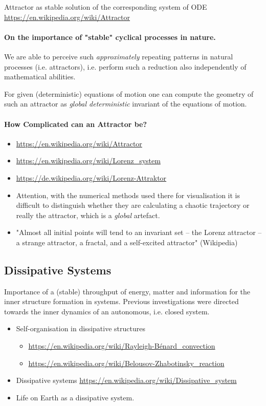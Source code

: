 \documentclass[11pt,a4paper]{article}
\begin{document}
Attractor as stable solution of the corresponding system of ODE\\
\url{https://en.wikipedia.org/wiki/Attractor}

\paragraph{On the importance of "stable" cyclical processes in nature.}
We are able to perceive such \emph{approximately} repeating patterns in
natural processes (i.e. attractors), i.e.  perform such a reduction also
independently of mathematical abilities.

For given (deterministic) equations of motion one can compute the geometry of
such an attractor as \emph{global deterministic} invariant of the equations of
motion.

\paragraph{How Complicated can an Attractor be?}
\begin{itemize}
\item \url{https://en.wikipedia.org/wiki/Attractor}
\item \url{https://en.wikipedia.org/wiki/Lorenz_system}
\item \url{https://de.wikipedia.org/wiki/Lorenz-Attraktor}
\item Attention, with the numerical methods used there for visualisation it is
  difficult to distinguish whether they are calculating a chaotic trajectory
  or really the attractor, which is a \emph{global} artefact.
\item "Almost all initial points will tend to an invariant set – the Lorenz
  attractor – a strange attractor, a fractal, and a self-excited attractor"
  (Wikipedia)
\end{itemize}

\subsection{Dissipative Systems}

Importance of a (stable) throughput of energy, matter and information for the
inner structure formation in systems.  Previous investigations were directed
towards the inner dynamics of an autonomous, i.e. closed system.

\begin{itemize}
\item Self-organisation in dissipative structures
  \begin{itemize}
  \item \url{https://en.wikipedia.org/wiki/Rayleigh-Bénard_convection}
  \item \url{https://en.wikipedia.org/wiki/Belousov-Zhabotinsky_reaction}
  \end{itemize}
\item Dissipative systems
  \url{https://en.wikipedia.org/wiki/Dissipative_system} 
\item Life on Earth as a dissipative system.
\end{itemize}
\end{document}
